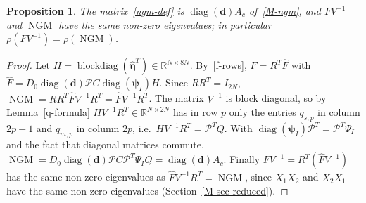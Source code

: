 \documentclass[11pt]{article}
\theoremstyle{plain}
\newtheorem{proposition}[theorem]{Proposition}
\theoremstyle{remark}
\numberwithin{equation}{section}
\begin{document}
\begin{proposition}\label{fv}
The matrix~\eqref{ngm-def} is $\operatorname{diag}(\bm d)A_c$
of~\eqref{M-ngm}, and $FV^{-1}$ and $\operatorname{NGM}$ have the same
non-zero eigenvalues; in particular
$\rho\left(FV^{-1}\right)=\rho\left(\operatorname{NGM}\right)$.
\end{proposition}
\begin{proof}
Let $H=\operatorname{blockdiag}(\widehat{\bm\eta}^T)\in\mathbb{R}^{N\times 8N}$.
By~\eqref{f-rows}, $F=R^T\widehat F$ with
$\widehat F=D_0\operatorname{diag}(\bm d)\mathscr{P}C\operatorname{diag}(\bm\psi_I)H$.
Since $RR^T=I_{2N}$, $\operatorname{NGM}=RR^T\widehat FV^{-1}R^T=\widehat FV^{-1}R^T$.
The matrix $V^{-1}$ is block diagonal, so by Lemma~\ref{q-formula}
$HV^{-1}R^T\in\mathbb{R}^{N\times 2N}$
has in row $p$ only the entries $q_{s,p}$ in column $2p-1$ and $q_{m,p}$ in
column $2p$, i.e.\ $HV^{-1}R^T=\mathscr{P}^TQ$. With
$\operatorname{diag}(\bm\psi_I)\mathscr{P}^T=\mathscr{P}^T\Psi_I$ and the
fact that diagonal matrices commute,
$\operatorname{NGM}=D_0\operatorname{diag}(\bm d)\mathscr{P}C\mathscr{P}^T\Psi_IQ
=\operatorname{diag}(\bm d)A_c$.
Finally $FV^{-1}=R^T\left(\widehat FV^{-1}\right)$ has the same non-zero
eigenvalues as $\widehat FV^{-1}R^T=\operatorname{NGM}$, since $X_1X_2$ and
$X_2X_1$ have the same non-zero eigenvalues (Section~\ref{M-sec-reduced}).
\end{proof}





\end{document}
